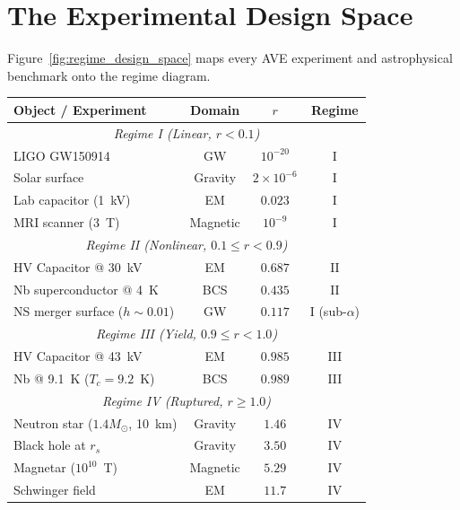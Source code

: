\section{The Experimental Design Space}

Figure~\ref{fig:regime_design_space} maps every AVE experiment and astrophysical benchmark onto the regime diagram.

\begin{center}
\begin{tabular}{|l|c|c|c|}
\hline
\textbf{Object / Experiment} & \textbf{Domain} & \textbf{$r$} & \textbf{Regime} \\ \hline
\multicolumn{4}{|c|}{\textit{Regime I (Linear, $r < 0.1$)}} \\ \hline
LIGO GW150914              & GW       & $10^{-20}$ & I \\
Solar surface              & Gravity  & $2 \times 10^{-6}$  & I \\
Lab capacitor (1~kV)       & EM       & $0.023$    & I \\
MRI scanner (3~T)          & Magnetic & $10^{-9}$  & I \\
\hline
\multicolumn{4}{|c|}{\textit{Regime II (Nonlinear, $0.1 \leq r < 0.9$)}} \\ \hline
HV Capacitor @ 30~kV          & EM       & $0.687$    & II \\
Nb superconductor @ 4~K    & BCS      & $0.435$    & II \\
NS merger surface ($h \sim 0.01$) & GW & $0.117$    & I (sub-$\alpha$) \\
\hline
\multicolumn{4}{|c|}{\textit{Regime III (Yield, $0.9 \leq r < 1.0$)}} \\ \hline
HV Capacitor @ 43~kV          & EM       & $0.985$    & III \\
Nb @ 9.1~K ($T_c = 9.2$~K) & BCS    & $0.989$    & III \\
\hline
\multicolumn{4}{|c|}{\textit{Regime IV (Ruptured, $r \geq 1.0$)}} \\ \hline
Neutron star ($1.4 M_\odot$, 10~km) & Gravity & $1.46$ & IV \\
Black hole at $r_s$        & Gravity  & $3.50$     & IV \\
Magnetar ($10^{10}$~T)     & Magnetic & $5.29$     & IV \\
Schwinger field             & EM      & $11.7$     & IV \\
\hline
\end{tabular}
\end{center}

